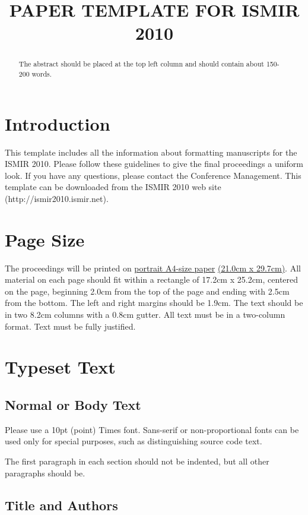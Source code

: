 \documentclass{article}
\title{PAPER TEMPLATE FOR ISMIR 2010}
\begin{document}
%
\maketitle
%
\begin{abstract}
The abstract should be placed at the top left column and should contain about 150-200 words.
\end{abstract}
%
\section{Introduction}\label{sec:introduction}

This template includes all the information about formatting manuscripts for the ISMIR 2010. 
Please follow these guidelines to give the final proceedings a uniform look. 
If you have any questions, please contact the Conference Management.
This template can be downloaded from the ISMIR 2010 web site (http://ismir2010.ismir.net).

\section{Page Size}\label{sec:page_size}

The proceedings will be printed on 
 \underline{portrait A4-size paper} \underline{(21.0cm x 29.7cm)}. 
All material on each page should fit within a rectangle of 17.2cm x 25.2cm, 
centered on the page, beginning 2.0cm 
from the top of the page and ending with 2.5cm from the bottom. 
The left and right margins should be 1.9cm. 
The text should be in two 8.2cm columns with a 0.8cm gutter. 
All text must be in a two-column format. 
Text must be fully justified.

\section{Typeset Text}\label{sec:typeset_text}

\subsection{Normal or Body Text}\label{subsec:body}

Please use a 10pt (point) Times font. Sans-serif or non-proportional fonts 
can be used only for special purposes, such as distinguishing source code text.

The first paragraph in each section should not be indented, but all other paragraphs should be.

\subsection{Title and Authors}
\end{document}
